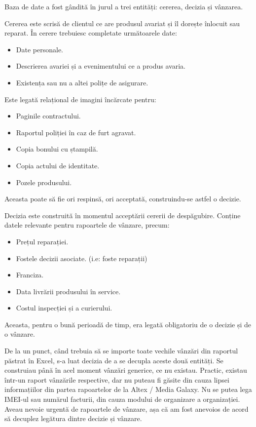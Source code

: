Baza de date a fost gândită în jurul a trei entități: cererea, decizia și vânzarea.

Cererea este scrisă de clientul ce are produsul avariat și îl dorește înlocuit sau reparat.
În cerere trebuiesc completate următoarele date:
\begin{itemize}
	\item Date personale.
	\item Descrierea avariei și a evenimentului ce a produs avaria.
	\item Existența sau nu a altei polițe de asigurare.
\end{itemize}
Este legată relațional de imagini încărcate pentru:
\begin{itemize}
	\item Paginile contractului.
	\item Raportul poliției în caz de furt agravat.
	\item Copia bonului cu ștampilă.
	\item Copia actului de identitate.
	\item Pozele produsului.
\end{itemize}
Aceasta poate să fie ori respinsă, ori acceptată, construindu-se astfel o decizie.

Decizia este construită în momentul acceptării cererii de despăgubire.
Conține datele relevante pentru rapoartele de vânzare, precum:
\begin{itemize}
	\item Prețul reparației.
	\item Fostele decizii asociate. (i.e: foste reparații)
	\item Franciza.
	\item Data livrării produsului în service.
	\item Costul inspecției și a curierului.
\end{itemize}
Aceasta, pentru o bună perioadă de timp, era legată obligatoriu de o decizie și de o vânzare.

De la un punct, când trebuia să se importe toate vechile vânzări din raportul păstrat în Excel, s-a luat decizia de a se decupla aceste două entități.
Se construiau până în acel moment vânzări generice, ce nu existau.
Practic, existau într-un raport vânzările respective, dar nu puteau fi găsite din cauza lipsei informațiilor din partea rapoartelor de la Altex / Media Galaxy.
Nu se putea lega IMEI-ul sau numărul facturii, din cauza modului de organizare a organizației.
Aveau nevoie urgentă de rapoartele de vânzare, așa că am fost anevoios de acord să decuplez legătura dintre decizie și vânzare.


